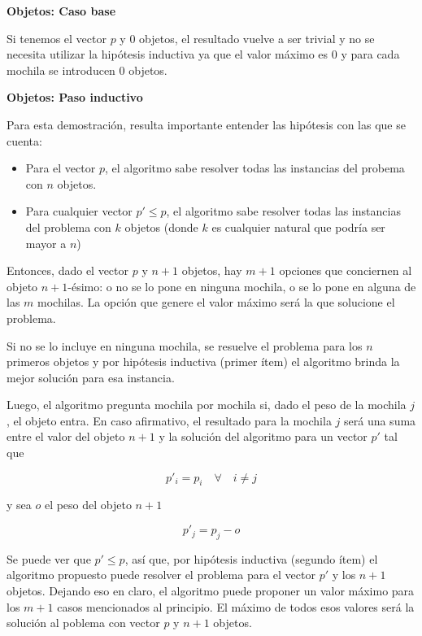 {\large\textbf{Objetos: Caso base}}

\vspace{5mm}

Si tenemos el vector $p$ y $0$ objetos, el resultado vuelve a ser trivial y no se necesita utilizar la hipótesis inductiva ya que el valor máximo es $0$ y para cada mochila se introducen $0$ objetos.

\vspace{5mm}

{\large\textbf{Objetos: Paso inductivo}}

\vspace{5mm}

Para esta demostración, resulta importante entender las hipótesis con las que se cuenta:

\begin{itemize}
\item Para el vector $p$, el algoritmo sabe resolver todas las instancias del probema con $n$ objetos.
\item Para cualquier vector $p' \leq p$, el algoritmo sabe resolver todas las instancias del problema con $k$ objetos (donde $k$ es cualquier natural que podría ser mayor a $n$)
\end{itemize}

Entonces, dado el vector $p$ y $n + 1$ objetos, hay $m + 1$ opciones que conciernen al objeto $n + 1$-ésimo: o no se lo pone en ninguna mochila, o se lo pone en alguna de las $m$ mochilas. La opción que genere el valor máximo será la que solucione el problema.

Si no se lo incluye en ninguna mochila, se resuelve el problema para los $n$ primeros objetos y por hipótesis inductiva (primer ítem) el algoritmo brinda la mejor solución para esa instancia.

Luego, el algoritmo pregunta mochila por mochila si, dado el peso de la mochila $j$, el objeto entra. En caso afirmativo, el resultado para la mochila $j$ será una suma entre el valor del objeto $n + 1$ y la solución del algoritmo para un vector $p'$ tal que

$$p'_i = p_i \quad \forall \quad i \neq j$$

y sea $o$ el peso del objeto $n + 1$

$$p'_j = p_j - o$$

Se puede ver que $p' \leq p$, así que, por hipótesis inductiva (segundo ítem) el algoritmo propuesto puede resolver el problema para el vector $p'$ y los $n + 1$ objetos. Dejando eso en claro, el algoritmo puede proponer un valor máximo para los $m + 1$ casos mencionados al principio. El máximo de todos esos valores será la solución al poblema con vector $p$ y $n + 1$ objetos.


